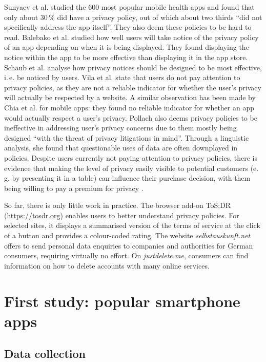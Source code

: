\documentclass{llncs}
\begin{document}
Sunyaev et al. \cite{Sunyaev14} studied the 600 most popular mobile health apps and found that only about 30\,\% did have a privacy policy, out of which about two thirds ``did not specifically address the app itself''. They also deem these policies to be hard to read. Balebako et al. \cite{Balebako15} studied how well users will take notice of the privacy policy of an app depending on when it is being displayed. They found displaying the notice within the app to be more effective than displaying it in the app store. 
Schaub et al. \cite{Schaub15} analyse how privacy notices should be designed to be most effective, i.\,e. be noticed by users.
Vila et al. \cite{VilaGM04} state that users do not pay attention to privacy policies, as they are not a reliable indicator for whether the user's privacy will actually be respected by a website. A similar observation has been made by Chia et al. \cite{Chia12} for mobile apps: they found no reliable indicator for whether an app would actually respect a user's privacy.
Pollach \cite{Pollach07} also deems privacy policies to be ineffective in addressing user's privacy concerns due to them mostly being designed ``with the threat of privacy litigations in mind''. Through a linguistic analysis, she found that questionable uses of data are often downplayed in policies.
Despite users currently not paying attention to privacy policies, there is evidence that making the level of privacy easily visible to potential customers (e.\,g. by presenting it in a table) can influence their purchase decision, with them being willing to pay a premium for privacy \cite{Tsai11}.

So far, there is only little work in practice. The browser add-on ToS;DR (\url{https://tosdr.org}) enables users to better understand privacy policies. For selected sites, it displays a summarised version of the terms of service at the click of a button and provides a colour-coded rating. The website \emph{selbstauskunft.net} offers to send personal data enquiries to companies and authorities for German consumers, requiring virtually no effort. On \emph{justdelete.me}, consumers can find information on how to delete accounts with many online services.


\section{First study: popular smartphone apps}


\subsection{Data collection}
\end{document}

